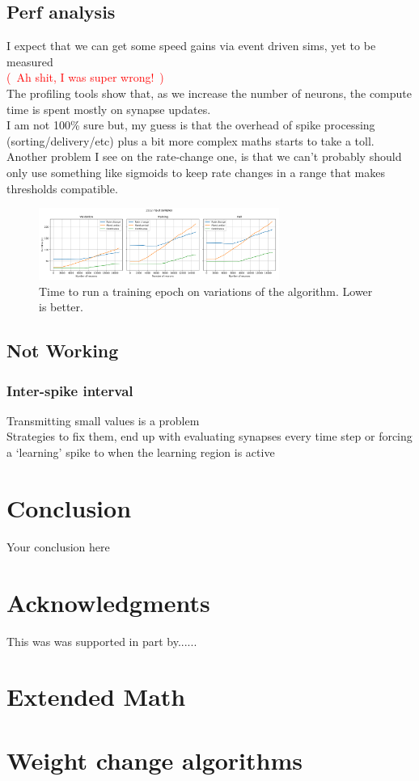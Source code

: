 \documentclass{article}
\newcommand\note[1]{\textcolor{red}{(~#1~)}}
\begin{document}
\subsection{Perf analysis}

I expect that we can get some speed gains via event driven sims, yet to be measured\\
\note{Ah shit, I was super wrong!}\\
The profiling tools show that, as we increase the number of neurons, the compute time is spent mostly on synapse updates.\\
I am not 100\% sure but, my guess is that the overhead of spike processing (sorting/delivery/etc) plus a bit more complex maths starts to take a toll.\\
Another problem I see on the rate-change one, is that we can't probably should only use something like sigmoids to keep rate changes in a range that makes thresholds compatible. \\
\begin{figure}[!hbt]
    \centering
    \includegraphics[width=0.7\textwidth,trim={0 0 12.2cm 1cm},clip]{perf_comparison_with_503_inputs.png}
    \caption{Time to run a training epoch on variations of the algorithm. Lower is better.}
    \label{fig:}
\end{figure}

\subsection{Not Working}
\subsubsection{Inter-spike interval}
Transmitting small values is a problem \\ 
Strategies to fix them, end up with evaluating synapses every time step or forcing a `learning' spike to when the learning region is active


\section{Conclusion}
Your conclusion here

\section*{Acknowledgments}
This was was supported in part by......

\appendix
\section{Extended Math}


\section{Weight change algorithms}


  
  
\end{document}
